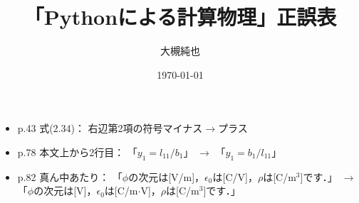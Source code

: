 \documentclass[11pt]{jsarticle}
\title{ 「Pythonによる計算物理」正誤表}
\author{大槻純也}
\date{\today}
\begin{document}
\maketitle

\begin{itemize}

\item
p.43 式(2.34)： 右辺第2項の符号マイナス$\to$プラス

\item
p.78 本文上から2行目：
「$y_1 = l_{11}/b_1$」
$\to$
「$y_1 = b_1/l_{11}$」

\item
p.82 真ん中あたり：
「$\phi$の次元は[V/m]，$\epsilon_0$は[C/V]，$\rho$は[C/m$^3$]です．」
$\to$
「$\phi$の次元は[V]，$\epsilon_0$は[C/m$\cdot$V]，$\rho$は[C/m$^3$]です．」

\end{itemize}
\end{document}
